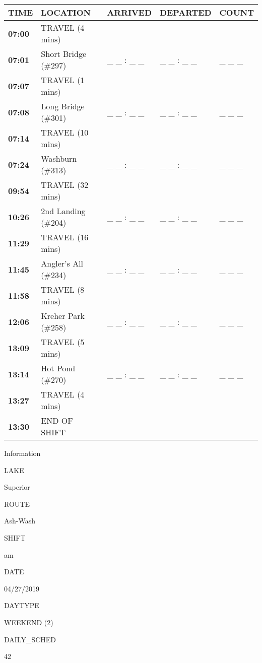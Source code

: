 \documentclass[]{article}
\begin{document}
\begin{tabular}{>{\bfseries}lllll}
\toprule
\textbf{TIME} & \textbf{LOCATION} & \textbf{ARRIVED} & \textbf{DEPARTED} & \textbf{COUNT}\\
\midrule
07:00 & TRAVEL (4 mins) &  &  & \\
07:01 & Short Bridge (\#297) & \_ \_ : \_ \_ & \_ \_ : \_ \_ & \_ \_ \_\\
07:07 & TRAVEL (1 mins) &  &  & \\
07:08 & Long Bridge (\#301) & \_ \_ : \_ \_ & \_ \_ : \_ \_ & \_ \_ \_\\
07:14 & TRAVEL (10 mins) &  &  & \\
07:24 & Washburn (\#313) & \_ \_ : \_ \_ & \_ \_ : \_ \_ & \_ \_ \_\\
09:54 & TRAVEL (32 mins) &  &  & \\
10:26 & 2nd Landing (\#204) & \_ \_ : \_ \_ & \_ \_ : \_ \_ & \_ \_ \_\\
11:29 & TRAVEL (16 mins) &  &  & \\
11:45 & Angler's All (\#234) & \_ \_ : \_ \_ & \_ \_ : \_ \_ & \_ \_ \_\\
11:58 & TRAVEL (8 mins) &  &  & \\
12:06 & Kreher Park (\#258) & \_ \_ : \_ \_ & \_ \_ : \_ \_ & \_ \_ \_\\
13:09 & TRAVEL (5 mins) &  &  & \\
13:14 & Hot Pond (\#270) & \_ \_ : \_ \_ & \_ \_ : \_ \_ & \_ \_ \_\\
13:27 & TRAVEL (4 mins) &  &  & \\
13:30 & END OF SHIFT &  &  & \\
\bottomrule
\end{tabular}\newpage

Information

LAKE

Superior

ROUTE

Ash-Wash

SHIFT

am

DATE

04/27/2019

DAYTYPE

WEEKEND (2)

DAILY\_SCHED

42

\vspace{24pt}
\end{document}
